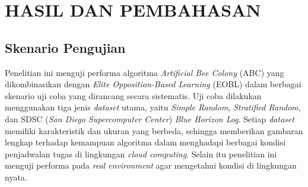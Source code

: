 \chapter{HASIL DAN PEMBAHASAN}

\section{Skenario Pengujian}
Penelitian ini menguji performa algoritma \textit{Artificial Bee Colony} (ABC) yang dikombinasikan dengan \textit{Elite Opposition-Based Learning} (EOBL) dalam berbagai skenario uji coba yang dirancang secara sistematis. Uji coba dilakukan menggunakan tiga jenis \textit{dataset} utama, yaitu \textit{Simple Random}, \textit{Stratified Random}, dan SDSC (\textit{San Diego Supercomputer Center}) \textit{Blue Horizon Log}. Setiap \textit{dataset} memiliki karakteristik dan ukuran yang berbeda, sehingga memberikan gambaran lengkap terhadap kemampuan algoritma dalam menghadapi berbagai kondisi penjadwalan tugas di lingkungan \textit{cloud computing}. Selain itu penelitian ini menguji performa pada \textit{real environment} agar mengetahui kondisi di lingkungan nyata.

